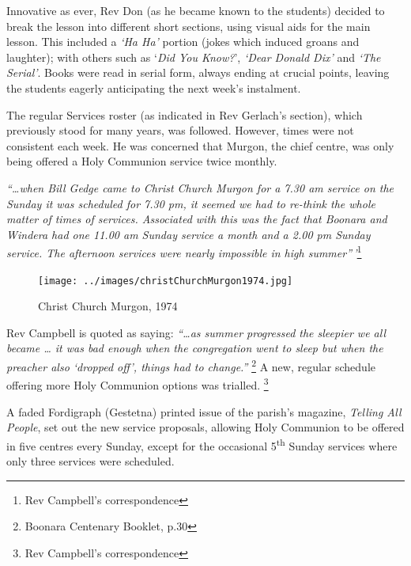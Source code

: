 Innovative as ever, Rev Don (as he became known to the students) decided to break the lesson into different short sections, using visual aids for the main lesson. This included a \emph{`Ha Ha'} portion (jokes which induced groans and laughter); with others such as `\emph{Did You Know?}', \emph{`Dear Donald Dix'} and \emph{`The Serial'}. Books were read in serial form, always ending at crucial points, leaving the students eagerly anticipating the next week's instalment.



The regular Services roster (as indicated in Rev Gerlach's section), which previously stood for many years, was followed. However, times were not consistent each week. He was concerned that Murgon, the chief centre, was only being offered a Holy Communion service twice monthly.



\emph{``\ldots when Bill Gedge came to Christ Church Murgon for a 7.30 am service on the Sunday it was scheduled for 7.30 pm, it seemed we had to re-think the whole matter of times of services. Associated with this was the fact that Boonara and Windera had one 11.00 am Sunday service a month and a 2.00 pm Sunday service. The afternoon services were nearly impossible in high summer''\,'}\footnote{Rev Campbell's correspondence}








\begin{figure}
\begin{center}
\texttt{[image: ../images/christChurchMurgon1974.jpg]}
\caption{Christ Church Murgon, 1974}
\end{center}
\end{figure}




Rev Campbell is quoted as saying: \emph{``\ldots as summer progressed the sleepier we all became \ldots{} it was bad enough when the congregation went to sleep but when the preacher also `dropped off', things had to change.''} \footnote{Boonara Centenary Booklet, p.30} A new, regular schedule offering more Holy Communion options was trialled. \footnote{Rev Campbell's correspondence}


A faded Fordigraph (Gestetna) printed issue of the parish's magazine, \emph{Telling All People}, set out the new service proposals, allowing Holy Communion to be offered in five centres every Sunday, except for the occasional 5\textsuperscript{th} Sunday services where only three services were scheduled.




